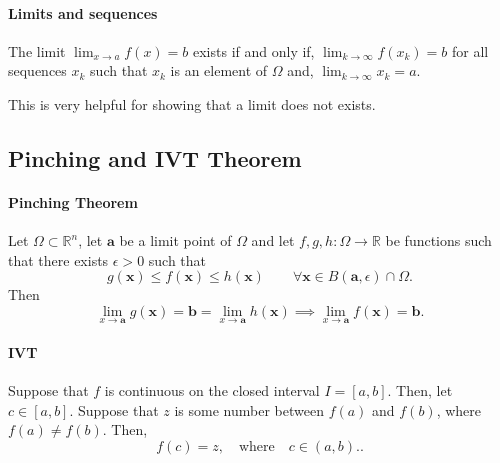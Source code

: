 \paragraph{Limits and sequences}
The limit \(\lim_{x\to a} f(x) = b\) exists if and only if,
\(\lim_{k\to\infty} f(x_k) = b\)  for all sequences \({x_k}\) such that 
\(x_k\) is an element of \(\Omega\) and,
\(\lim_{k\to\infty} x_k = a\).

This is very helpful for showing that a limit does not exists.

\subsection{Pinching and IVT Theorem}

\paragraph{Pinching Theorem}
Let \(\Omega \subset \mathbb{R}^n\), let \(\textbf{a}\) be a limit point of \(\Omega\)
and let \(f,g ,h: \Omega \rightarrow \mathbb{R}\) be functions such that there exists
\(\epsilon > 0\) such that
\[
    g(\textbf{x}) \leq f(\textbf{x}) \leq h(\textbf{x}) \qquad
    \forall \textbf{x} \in B(\textbf{a}, \epsilon) \cap \Omega.
\]
Then
\[
    \lim_{x\to \textbf{a}} g(\textbf{x}) = \textbf{b} = \lim_{x\to \textbf{a}} h(\textbf{x})
    \implies \lim_{x\to \textbf{a}} f(\textbf{x}) = \textbf{b}.
\]

\paragraph{IVT}
Suppose that \(f\) is continuous on the closed interval  \(I = [a, b]\). Then,
let  \(c \in [a, b]\). Suppose that \(z\) is some number between \(f(a)\) and
\(f(b)\), where  \(f(a) \neq f(b)\).
Then, \[
    f(c) = z, \quad \text{where} \quad c \in (a, b).
.\] 

